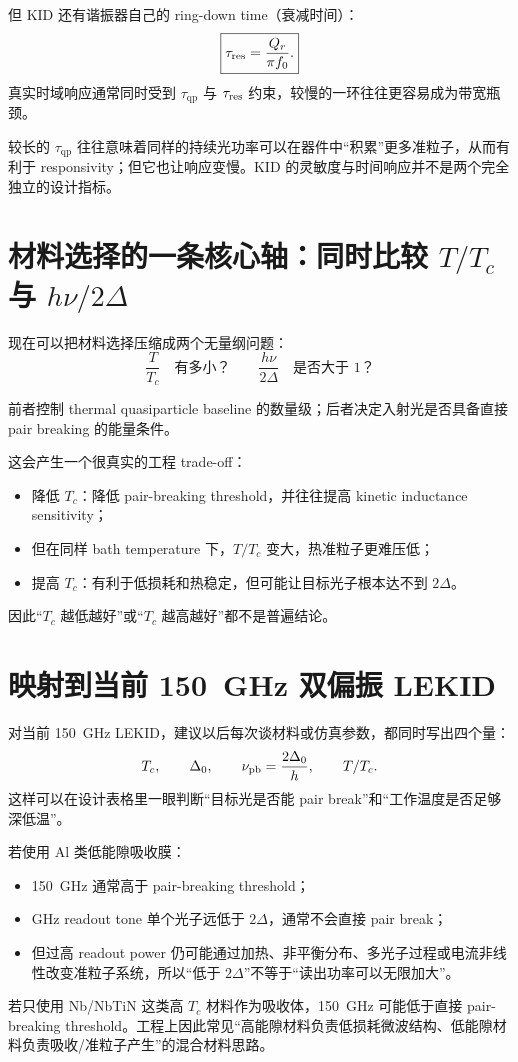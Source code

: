 \documentclass[11pt,a4paper,openany]{ctexrep}
\newcommand{\qp}{\mathrm{qp}}
\begin{document}
但 KID 还有谐振器自己的 ring-down time（衰减时间）：
\[
\boxed{
\tau_{\rm res}
=
\frac{Q_r}{\pi f_0}.
}
\]
真实时域响应通常同时受到 $\tau_{\qp}$ 与 $\tau_{\rm res}$ 约束，较慢的一环往往更容易成为带宽瓶颈。

\begin{intuitionbox}
较长的 $\tau_{\qp}$ 往往意味着同样的持续光功率可以在器件中“积累”更多准粒子，从而有利于 responsivity；但它也让响应变慢。KID 的灵敏度与时间响应并不是两个完全独立的设计指标。
\end{intuitionbox}

\section{材料选择的一条核心轴：同时比较 $T/T_c$ 与 $h\nu/2\Delta$}

现在可以把材料选择压缩成两个无量纲问题：
\[
\boxed{
\frac{T}{T_c}\quad\text{有多小？}
}
\qquad
\boxed{
\frac{h\nu}{2\Delta}\quad\text{是否大于 1？}
}
\]

前者控制 thermal quasiparticle baseline 的数量级；后者决定入射光是否具备直接 pair breaking 的能量条件。

这会产生一个很真实的工程 trade-off：
\begin{itemize}
  \item 降低 $T_c$：降低 pair-breaking threshold，并往往提高 kinetic inductance sensitivity；
  \item 但在同样 bath temperature 下，$T/T_c$ 变大，热准粒子更难压低；
  \item 提高 $T_c$：有利于低损耗和热稳定，但可能让目标光子根本达不到 $2\Delta$。
\end{itemize}

因此“$T_c$ 越低越好”或“$T_c$ 越高越好”都不是普遍结论。

\section{映射到当前 \SI{150}{GHz} 双偏振 LEKID}

\begin{projectbox}
对当前 \SI{150}{GHz} LEKID，建议以后每次谈材料或仿真参数，都同时写出四个量：
\[
T_c,\qquad
\Delta_0,\qquad
\nu_{\rm pb}=\frac{2\Delta_0}{h},\qquad
T/T_c.
\]
这样可以在设计表格里一眼判断“目标光是否能 pair break”和“工作温度是否足够深低温”。

若使用 Al 类低能隙吸收膜：
\begin{itemize}
  \item \SI{150}{GHz} 通常高于 pair-breaking threshold；
  \item GHz readout tone 单个光子远低于 $2\Delta$，通常不会直接 pair break；
  \item 但过高 readout power 仍可能通过加热、非平衡分布、多光子过程或电流非线性改变准粒子系统，所以“低于 $2\Delta$”不等于“读出功率可以无限加大”。
\end{itemize}

若只使用 Nb/NbTiN 这类高 $T_c$ 材料作为吸收体，\SI{150}{GHz} 可能低于直接 pair-breaking threshold。工程上因此常见“高能隙材料负责低损耗微波结构、低能隙材料负责吸收/准粒子产生”的混合材料思路。
\end{projectbox}
\end{document}
